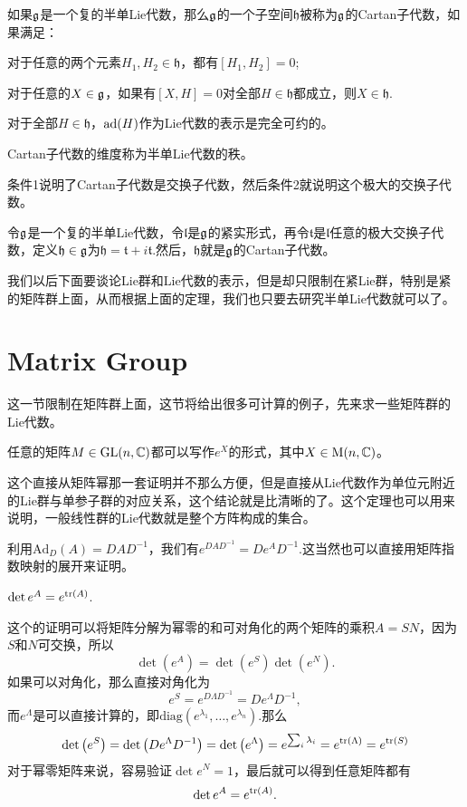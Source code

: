 \para 如果${\mathfrak{g}}$是一个复的半单Lie代数，那么${\mathfrak{g}}$的一个子空间$\mathfrak{h}$被称为${\mathfrak{g}}$的Cartan子代数，如果满足：

 对于任意的两个元素$H_1,H_2\in\mathfrak{h}$，都有$[H_1,H_2]=0$;

 对于任意的$X\in {\mathfrak{g}}$，如果有$[X,H]=0$对全部$H\in\mathfrak{h}$都成立，则$X\in \mathfrak{h}$.

 对于全部$H\in \mathfrak{h}$，$\operatorname{ad}(H)$作为Lie代数的表示是完全可约的。

Cartan子代数的维度称为半单Lie代数的秩。

条件1说明了Cartan子代数是交换子代数，然后条件2就说明这个极大的交换子代数。

\pro 令${\mathfrak{g}}$是一个复的半单Lie代数，令$\mathfrak{l}$是${\mathfrak{g}}$的紧实形式，再令$\mathfrak{t}$是$\mathfrak{l}$任意的极大交换子代数，定义$\mathfrak{h}\in{\mathfrak{g}}$为$\mathfrak{h}=\mathfrak{t}+i\mathfrak{t}$.然后，$\mathfrak{h}$就是${\mathfrak{g}}$的Cartan子代数。

我们以后下面要谈论Lie群和Lie代数的表示，但是却只限制在紧Lie群，特别是紧的矩阵群上面，从而根据上面的定理，我们也只要去研究半单Lie代数就可以了。

\section{Matrix Group}
这一节限制在矩阵群上面，这节将给出很多可计算的例子，先来求一些矩阵群的Lie代数。

\theo 任意的矩阵$M\in\mathrm{GL}(n,\mathbb{C})$都可以写作$e^X$的形式，其中$X\in\mathrm{M}(n,\mathbb{C})$。

这个直接从矩阵幂那一套证明并不那么方便，但是直接从Lie代数作为单位元附近的Lie群与单参子群的对应关系，这个结论就是比清晰的了。这个定理也可以用来说明，一般线性群的Lie代数就是整个方阵构成的集合。

\para 利用$\mathrm{Ad}_D(A)=DAD^{-1}$，我们有$e^{DAD^{-1}}=De^{A}D^{-1}$.这当然也可以直接用矩阵指数映射的展开来证明。

\pro $\det e^A=e^{\operatorname{tr}(A)}$.

这个的证明可以将矩阵分解为幂零的和可对角化的两个矩阵的乘积$A=SN$，因为$S$和$N$可交换，所以
\[
	\det \left(e^A\right)=\det\left(e^S\right)\det\left(e^N\right).
\]
如果可以对角化，那么直接对角化为
\[
	e^{S}=e^{D\Lambda D^{-1}}=De^{\Lambda} D^{-1},
\]
而$e^{\Lambda}$是可以直接计算的，即$\mathrm{diag}\left(e^{\lambda_1},\dots,e^{\lambda_n}\right)$.那么
\[
	\det \left(e^{S}\right)=\det \left(De^{\Lambda} D^{-1}\right)=\det \left(e^{\Lambda}\right)=e^{\sum_i \lambda_i}=e^{\operatorname{tr}(\Lambda)}=e^{\operatorname{tr}(S)}
\]
对于幂零矩阵来说，容易验证$\det e^N=1$，最后就可以得到任意矩阵都有
\[
	\det e^A=e^{\operatorname{tr}(A)}.
\]

